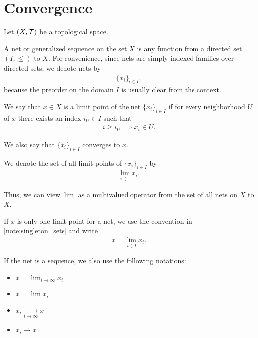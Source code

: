 \section{Convergence}\label{sec:convergence}

Let $(X, \mathcal T)$ be a topological space.

\begin{definition}\label{def:topological_net}\cite[49]{Engelking1989}
  A \ul{net} or \ul{generalized sequence} on the set $X$ is any function from a directed set $(I, \leq)$ to $X$. For convenience, since nets are simply indexed families over directed sets, we denote nets by
  \begin{align*}
    \{ x_i \}_{i \in I},
  \end{align*}
  because the preorder on the domain $I$ is usually clear from the context.
\end{definition}

\begin{definition}\label{def:net_limit_point}\cite[49]{Engelking1989}
  We say that $x \in X$ is a \ul{limit point of the net $\{ x_i \}_{i \in I}$} if for every neighborhood $U$ of $x$ there exists an index $i_U \in I$ such that
  \begin{align*}
    i \geq i_U \implies x_i \in U.
  \end{align*}

  We also say that $\{ x_i \}_{i \in I}$ \ul{converges to $x$}.

  We denote the set of all limit points of $\{ x_i \}_{i \in I}$ by
  \begin{align*}
    \lim_{i \in I} x_i.
  \end{align*}

  Thus, we can view $\lim$ as a multivalued operator from the set of all nets on $X$ to $X$.

  If $x$ is only one limit point for a net, we use the convention in \cref{note:singleton_sets} and write
  \begin{align*}
    x = \lim_{i \in I} x_i.
  \end{align*}

  If the net is a sequence, we also use the following notations:
  \begin{itemize}
    \item $x = \lim_{i \to \infty} x_i$
    \item $x = \lim x_i$
    \item $x_i \xrightarrow[i \to \infty]{} x$
    \item $x_i \to x$
  \end{itemize}
\end{definition}

